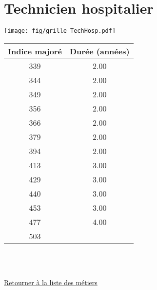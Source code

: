 \newpage 
 
\chapter{Technicien hospitalier} 

\begin{minipage}{0.55\linewidth}\texttt{[image: fig/grille\_TechHosp.pdf]}\end{minipage} 
\begin{minipage}{0.3\linewidth} 
 \begin{center} 

\begin{tabular}[htb]{|c|c|} 
\hline 
 Indice majoré &  Durée (années) \\ 
\hline \hline 
 339 &  2.00 \\ 
\hline 
 344 &  2.00 \\ 
\hline 
 349 &  2.00 \\ 
\hline 
 356 &  2.00 \\ 
\hline 
 366 &  2.00 \\ 
\hline 
 379 &  2.00 \\ 
\hline 
 394 &  2.00 \\ 
\hline 
 413 &  3.00 \\ 
\hline 
 429 &  3.00 \\ 
\hline 
 440 &  3.00 \\ 
\hline 
 453 &  3.00 \\ 
\hline 
 477 &  4.00 \\ 
\hline 
 503 &   \\ 
\hline 
\hline 
\end{tabular} 
\end{center} 
 \end{minipage} 

~\\ 
 


   
 \localtableofcontents 

~\\ 
 
 \hyperlink{page.2}{\noindent Retourner à la liste des métiers}

 \newpage 

